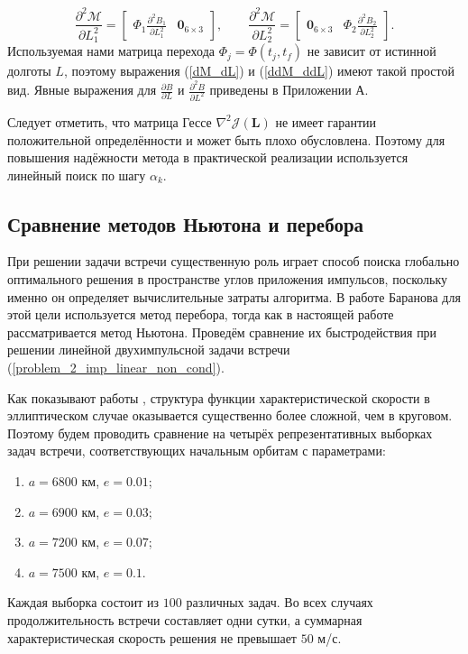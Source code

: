 \begin{equation}
    \frac{\partial^2 \mathcal{M}}{\partial L_1^2} = 
    \begin{bmatrix}
        \Phi_1 \frac{\partial^2 B_1}{\partial L_1^2} & \mathbf{0}_{6 \times 3}
    \end{bmatrix},
    \quad \quad
    \frac{\partial^2 \mathcal{M}}{\partial L_2^2} = 
    \begin{bmatrix}
        \mathbf{0}_{6 \times 3} & \Phi_2 \frac{\partial^2 B_2}{\partial L_2^2}
    \end{bmatrix}.
\label{ddM_ddL}
\end{equation}
Используемая нами матрица перехода $\Phi_j = \Phi(t_j, t_f)$ не зависит от истинной долготы $L$, поэтому выражения (\ref{dM_dL}) и (\ref{ddM_ddL}) имеют такой простой вид. Явные выражения для $\frac{\partial B}{\partial L}$ и $\frac{\partial^2 B}{\partial L^2}$ приведены в Приложении А. 

Следует отметить, что матрица Гессе $\nabla^2 \mathcal{J}(\mathbf{L})$ не имеет гарантии положительной определённости и может быть плохо обусловлена. Поэтому для повышения надёжности метода в практической реализации используется линейный поиск по шагу $\alpha_k$.

\subsection{Сравнение методов Ньютона и перебора}

При решении задачи встречи существенную роль играет способ поиска глобально оптимального решения в пространстве углов приложения импульсов, поскольку именно он определяет вычислительные затраты алгоритма. В работе Баранова \cite{баранов2016маневрирование} для этой цели используется метод перебора, тогда как в настоящей работе рассматривается метод Ньютона. Проведём сравнение их быстродействия при решении линейной двухимпульсной задачи встречи (\ref{problem_2_imp_linear_non_cond}). 

Как показывают работы \cite{zhang2013optimal, wang2011optimal}, структура функции характеристической скорости в эллиптическом случае оказывается существенно более сложной, чем в круговом. Поэтому будем проводить сравнение на четырёх репрезентативных выборках задач встречи, соответствующих начальным орбитам с параметрами:
\begin{enumerate}
    \item $a = 6800$ км, $e = 0.01$;
    \item $a = 6900$ км, $e = 0.03$;
    \item $a = 7200$ км, $e = 0.07$;
    \item $a = 7500$ км, $e = 0.1$.
\end{enumerate}
Каждая выборка состоит из $100$ различных задач. Во всех случаях продолжительность встречи составляет одни сутки, а суммарная характеристическая скорость решения не превышает $50$ м/с.

